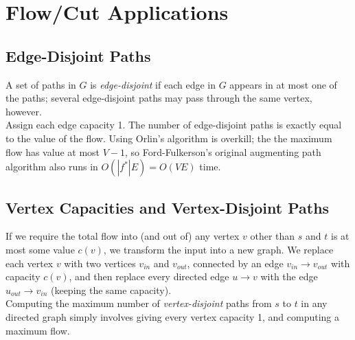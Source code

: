\section{Flow/Cut Applications}
\subsection{Edge-Disjoint Paths}
A set of paths in $G$ is \emph{edge-disjoint} if each edge in $G$ appears in at most one of the paths; several edge-disjoint paths may pass through the same vertex, however.\\

Assign each edge capacity 1. The number of edge-disjoint paths is exactly equal to the value of the flow. Using Orlin's algorithm is overkill; the the maximum flow has value at most $V - 1$, so Ford-Fulkerson's original augmenting path algorithm also runs in $O(\left|f^*\right| E) = O(VE)$ time.

\subsection{Vertex Capacities and Vertex-Disjoint Paths}
If we require the total flow into (and out of) any vertex $v$ other than $s$ and $t$ is at most some value $c(v)$, we transform the input into a new graph. We replace each vertex $v$ with two vertices $v_{in}$ and $v_{out}$, connected by an edge $v_{in} \rightarrow v_{out}$ with capacity $c(v)$, and then replace every directed edge $u \rightarrow v$ with the edge $u_{out} \rightarrow v_{in}$ (keeping the same capacity).\\

Computing the maximum number of \emph{vertex-disjoint} paths from $s$ to $t$ in any directed graph simply involves giving every vertex capacity 1, and computing a maximum flow.